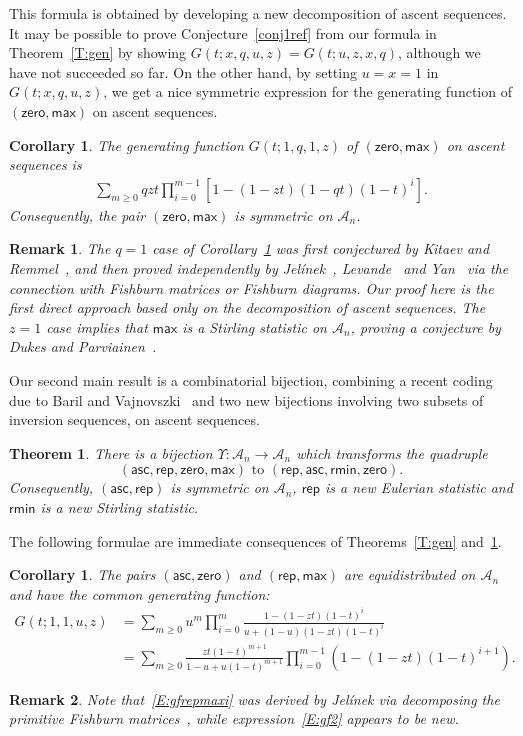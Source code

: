 \documentclass[12pt]{amsart}
\newcounter{mycount}
\theoremstyle{plain}
\newtheorem{theorem}[mycount]{Theorem}
\newtheorem{corollary}[mycount]{Corollary}
\newtheorem{remark}{Remark}
\theoremstyle{definition}
\theoremstyle{example}
\theoremstyle{remark}
\numberwithin{equation}{section}
\numberwithin{figure}{section}
\newcommand{\asc}{\mathsf{asc}}
\def\max{\mathsf{max}}
\def\zero{\mathsf{zero}}
\def\rep{\mathsf{rep}}
\def\rmin{\mathsf{rmin}}
\def\A{\mathcal{A}}
\begin{document}
This formula is obtained by developing a new decomposition of ascent sequences. It may be possible to prove Conjecture~\ref{conj1ref} from our formula in Theorem~\ref{T:gen} by showing
$G(t;x,q,u,z)=G(t;u,z,x,q)$, although we have not succeeded so far. On the other hand, by setting $u=x=1$ in $G(t;x,q,u,z)$, we get a nice symmetric expression for the generating function of $(\zero,\max)$ on ascent sequences.
\begin{corollary}\label{zero:max}The generating function $G(t;1,q,1,z)$ of $(\zero,\max)$ on ascent sequences is
\begin{align*}
\sum_{m\geq0}qzt\prod_{i=0}^{m-1}[1-(1-zt)(1-qt)(1-t)^i].
\end{align*}
Consequently,  the pair $(\zero,\max)$ is symmetric on $\A_n$.






\end{corollary}
\begin{remark}
The $q=1$ case of Corollary~\ref{zero:max} was first conjectured by Kitaev and Remmel~\cite{kr2}, and then proved independently by Jel\'inek~\cite{je}, Levande~\cite{lev} and Yan~\cite{yan} via the connection with Fishburn matrices or Fishburn diagrams. Our proof here is the first  direct approach based only on the decomposition of ascent sequences. The $z=1$ case implies that $\max$ is a Stirling statistic on $\A_n$, proving a conjecture by Dukes and Parviainen~\cite[Conj.~13]{dp}.
\end{remark}

Our second main result is a combinatorial bijection, combining a recent coding due to Baril and Vajnovszki~\cite{bv} and two new bijections involving two subsets of inversion sequences, on ascent sequences.

\begin{theorem}\label{bij:sym}
There is a bijection $\Upsilon:\A_n\rightarrow\A_n$ which transforms the quadruple
$$
(\asc,\rep,\zero,\max) \text{ to } (\rep,\asc,\rmin,\zero).
$$
Consequently, $(\asc,\rep)$ is symmetric on $\A_n$, $\rep$ is a new Eulerian statistic and $\rmin$ is a new Stirling statistic.
\end{theorem}

The following  formulae are immediate consequences of Theorems~\ref{T:gen} and~\ref{bij:sym}.
\begin{corollary}
The pairs $(\asc,\zero)$ and $(\rep,\max)$ are equidistributed on $\A_n$ and have the common  generating function:
\begin{align}\label{E:gfrepmaxi}
G(t;1,1,u,z)&=\sum_{m\geq0}u^m\prod_{i=0}^m \frac{1-(1-zt)(1-t)^i}{u+(1-u)(1-zt)(1-t)^i}\\
\label{E:gf2}&=\sum_{m\geq0}\frac{zt(1-t)^{m+1}}{1-u+u(1-t)^{m+1}}
\prod_{i=0}^{m-1}(1-(1-zt)(1-t)^{i+1}).
\end{align}
\end{corollary}
\begin{remark}
Note that~\eqref{E:gfrepmaxi} was derived by Jel\'{i}nek via decomposing the primitive Fishburn matrices~\cite{je}, while expression~\eqref{E:gf2} appears to be new.
\end{remark}
\end{document}
